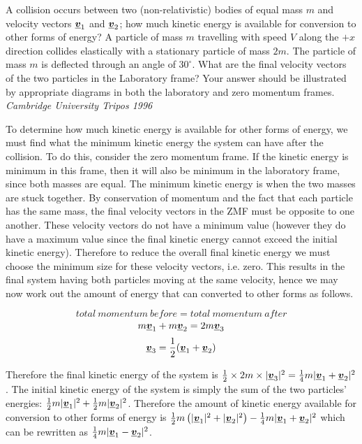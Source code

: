 \begin{problem} %
 {
A collision occurs between two (non-relativistic) bodies of equal mass $m$ and velocity vectors $\mathit{\underline{\boldsymbol{v}}}_{1}$ and $\mathit{\underline{\boldsymbol{v}}}_{2}$; how much kinetic energy is available for conversion to other forms of energy? 
A particle of mass $m$ travelling with speed $V$ along the $+x$ direction collides elastically with a stationary particle of mass $2m$.
The particle of mass $m$ is deflected through an angle of $30^{\circ}$.  What are the final velocity vectors of the two particles in the Laboratory frame?
Your answer should be illustrated by appropriate diagrams in both the laboratory and zero momentum frames.}
{\textit{Cambridge University Tripos 1996}}
{

To determine how much kinetic energy is available for other forms of energy, we must find what the minimum kinetic energy the system can have after the collision. To do this, consider the zero momentum frame. If the kinetic energy is minimum in this frame, then it will also be minimum in the laboratory frame, since both masses are equal. The minimum kinetic energy is when the two masses are stuck together. By conservation of momentum and the fact that each particle has the same mass, the final velocity vectors in the ZMF must be opposite to one another. These velocity vectors do not have a minimum value (however they do have a maximum value since the final kinetic energy cannot exceed the initial kinetic energy). Therefore to reduce the overall final kinetic energy we must choose the minimum size for these velocity vectors, i.e. zero. This results in the final system having both particles moving at the same velocity, hence we may now work out the amount of energy that can converted to other forms as follows.

\begin{equation*}total~momentum~before=total~momentum~after\end{equation*}
\begin{equation*}m\mathit{\underline{\boldsymbol{v}}}_{1}+m\mathit{\underline{\boldsymbol{v}}}_{2}=2m\mathit{\underline{\boldsymbol{v}}}_{3}\end{equation*}
\begin{equation*}\mathit{\underline{\boldsymbol{v}}}_{3}=\frac{1}{2}(\mathit{\underline{\boldsymbol{v}}}_{1}+\mathit{\underline{\boldsymbol{v}}}_{2})\end{equation*}

Therefore the final kinetic energy of the system is $\frac{1}{2}\times 2m \times |\mathit{\underline{\boldsymbol{v}}}_{3}|^2=\frac{1}{4}m|\mathit{\underline{\boldsymbol{v}}}_{1}+\mathit{\underline{\boldsymbol{v}}}_{2}|^2$. The initial kinetic energy of the system is simply the sum of the two particles' energies: $\frac{1}{2}m|\mathit{\underline{\boldsymbol{v}}}_{1}|^2+\frac{1}{2}m|\mathit{\underline{\boldsymbol{v}}}_{2}|^2$. Therefore the amount of kinetic energy available for conversion to other forms of energy is $\frac{1}{2}m\left(|\mathit{\underline{\boldsymbol{v}}}_{1}|^2+|\mathit{\underline{\boldsymbol{v}}}_{2}|^2\right)-\frac{1}{4}m|\mathit{\underline{\boldsymbol{v}}}_{1}+\mathit{\underline{\boldsymbol{v}}}_{2}|^2$ which can be rewritten as $\frac{1}{4}m|\mathit{\underline{\boldsymbol{v}}}_{1}-\mathit{\underline{\boldsymbol{v}}}_{2}|^2$.

}
\end{problem}
